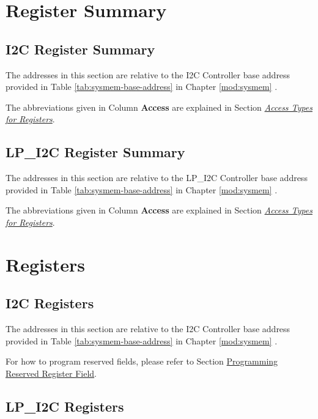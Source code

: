 \documentclass[main\_\_EN.tex]{subfiles}
\begin{document}

\newpage
\section{Register Summary}

\subsection{I2C Register Summary}
\label{sec:i2c-reg-summ}
\hypertarget{i2c-reg-summ}{}

The addresses in this section are relative to the I2C Controller base address provided in Table \ref{tab:sysmem-base-address} in Chapter \ref{mod:sysmem} \textit{}.

The abbreviations given in Column \textbf{Access} are explained in Section \hyperref[glossary-access-types]{\textit{Access Types for Registers}}.



\subsection{LP\_I2C Register Summary}
\label{sec:lp-i2c-reg-summ}
\hypertarget{lp-i2c-reg-summ}{}

The addresses in this section are relative to the LP\_I2C Controller base address provided in Table \ref{tab:sysmem-base-address} in Chapter \ref{mod:sysmem} \textit{}.

The abbreviations given in Column \textbf{Access} are explained in Section \hyperref[glossary-access-types]{\textit{Access Types for Registers}}.





\newpage
\section{Registers}

\subsection{I2C Registers}

The addresses in this section are relative to the I2C Controller base address provided in Table \ref{tab:sysmem-base-address} in Chapter \ref{mod:sysmem} \textit{}.

For how to program reserved fields, please refer to Section \hyperref[programming-reserved-field]{Programming Reserved Register Field}.



\subsection{LP\_I2C Registers}


\end{document}
